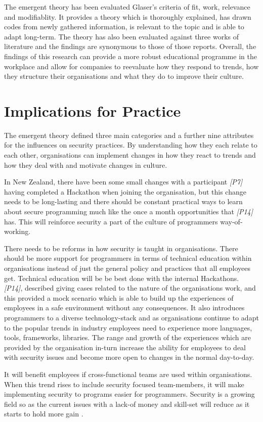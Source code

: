 \newline
\par 
The emergent theory has been evaluated Glaser's criteria of fit, work, relevance and modifiablity. It provides a theory which is thoroughly explained, has drawn codes from newly gathered information, is relevant to the topic and is able to adapt long-term. The theory has also been evaluated against three works of literature and the findings are synonymous to those of those reports. Overall, the findings of this research can provide a more robust educational programme in the workplace and allow for companies to reevaluate how they respond to trends, how they structure their organisations and what they do to improve their culture.

\section{Implications for Practice}

The emergent theory defined three main categories and a further nine attributes for the influences on security practices. By understanding how they each relate to each other, organisations can implement changes in how they react to trends and how they deal with and motivate changes in culture. 
\newline
\par
In New Zealand, there have been some small changes with a participant \textit{[P7] }having completed a Hackathon when joining the organisation, but this change needs to be long-lasting and there should be constant practical ways to learn about secure programming much like the once a month opportunities that \textit{[P14]} has. This will reinforce security a part of the culture of programmers way-of-working. 
 \newline
 \par
 There needs to be reforms in how security is taught in organisations. There should be more support for programmers in terms of technical education within organisations instead of just the general policy and practices that all employees get. Technical education will be be best done with the internal Hackathons. \textit{[P14]}, described giving cases related to the nature of the organisations work, and this provided a mock scenario which is able to build up the experiences of employees in a safe environment without any consequences. It also introduces programmers to a diverse technology-stack and as organisations continue to adapt to the popular trends in industry  employees need to experience more languages, tools, frameworks, libraries. The range and growth of the experiences which are provided by the organisation in-turn increase the ability for employees to deal with security issues and become more open to changes in the normal day-to-day.  
 \newline
 \par
 It will benefit employees if cross-functional teams are used within organisations. When this trend rises to include security focused team-members, it will make implementing security to programs easier for programmers. Security is a growing field so as the current issues with a lack-of money and skill-set will reduce as it starts to hold more gain \cite{grow}. 
 

